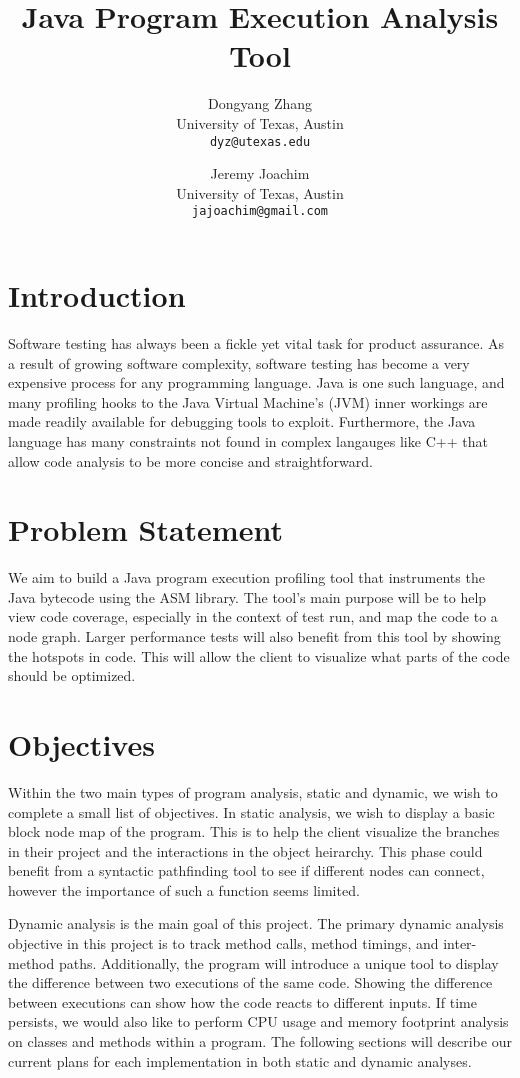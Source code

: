 \documentclass{article}
\title{Java Program Execution Analysis Tool}
\author{
  Dongyang Zhang \\
  {\fontsize{10}{11}\selectfont University of Texas, Austin}\\ 
  \texttt{dyz@utexas.edu}
\and
  Jeremy Joachim \\
  {\fontsize{10}{11}\selectfont University of Texas, Austin}\\ 
  \texttt{jajoachim@gmail.com}
}
\begin{document}
\maketitle

\section{Introduction}

Software testing has always been a fickle yet vital task for product assurance.
As a result of growing software complexity, software testing has become a very expensive process for any programming language.
Java is one such language, and many profiling hooks to the Java Virtual Machine's (JVM) inner workings are made readily available for debugging tools to exploit.
Furthermore, the Java language has many constraints not found in complex langauges like C++ that allow code analysis to be more concise and straightforward.

\section{Problem Statement}

We aim to build a Java program execution profiling tool that instruments the Java bytecode using the ASM library.
The tool's main purpose will be to help view code coverage, especially in the context of test run, and map the code to a node graph.
Larger performance tests will also benefit from this tool by showing the hotspots in code.
This will allow the client to visualize what parts of the code should be optimized.

\section{Objectives}

Within the two main types of program analysis, static and dynamic, we wish to complete a small list of objectives.
In static analysis, we wish to display a basic block node map of the program.
This is to help the client visualize the branches in their project and the interactions in the object heirarchy.
This phase could benefit from a syntactic pathfinding tool to see if different nodes can connect, however the importance of such a function seems limited. 

Dynamic analysis is the main goal of this project.
The primary dynamic analysis objective in this project is to track method calls, method timings, and inter-method paths.
Additionally, the program will introduce a unique tool to display the difference between two executions of the same code.
Showing the difference between executions can show how the code reacts to different inputs.
If time persists, we would also like to perform CPU usage and memory footprint analysis on classes and methods within a program.
The following sections will describe our current plans for each implementation in both static and dynamic analyses.
\end{document}
